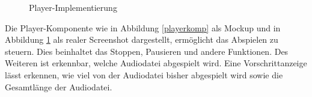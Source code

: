 \begin{figure}[ht]
\begin{minipage}[b]{0.45\linewidth}
\caption{Player-Implementierung}
\label{player}
\end{minipage}
\end{figure}

Die Player-Komponente wie in Abbildung \ref{playerkomp} als Mockup und in Abbildung \ref{player} als realer Screenshot dargestellt, ermöglicht das Abspielen zu steuern. Dies beinhaltet das Stoppen, Pausieren und andere Funktionen. Des Weiteren ist erkennbar, welche Audiodatei abgespielt wird. Eine Vorschrittanzeige lässt erkennen, wie viel von der Audiodatei bisher abgespielt wird sowie die Gesamtlänge der Audiodatei.

